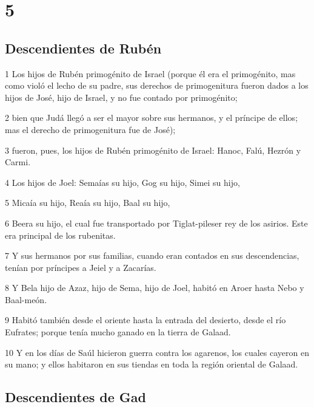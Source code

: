 \chapter{5}

\section*{Descendientes de Rubén}

\par 1 Los hijos de Rubén primogénito de Israel (porque él era el primogénito, mas como violó el lecho de su padre, sus derechos de primogenitura fueron dados a los hijos de José, hijo de Israel, y no fue contado por primogénito;
\par 2 bien que Judá llegó a ser el mayor sobre sus hermanos, y el príncipe de ellos; mas el derecho de primogenitura fue de José);
\par 3 fueron, pues, los hijos de Rubén primogénito de Israel: Hanoc, Falú, Hezrón y Carmi.
\par 4 Los hijos de Joel: Semaías su hijo, Gog su hijo, Simei su hijo,
\par 5 Micaía su hijo, Reaía su hijo, Baal su hijo,
\par 6 Beera su hijo, el cual fue transportado por Tiglat-pileser rey de los asirios. Este era principal de los rubenitas.
\par 7 Y sus hermanos por sus familias, cuando eran contados en sus descendencias, tenían por príncipes a Jeiel y a Zacarías.
\par 8 Y Bela hijo de Azaz, hijo de Sema, hijo de Joel, habitó en Aroer hasta Nebo y Baal-meón.
\par 9 Habitó también desde el oriente hasta la entrada del desierto, desde el río Eufrates; porque tenía mucho ganado en la tierra de Galaad.
\par 10 Y en los días de Saúl hicieron guerra contra los agarenos, los cuales cayeron en su mano; y ellos habitaron en sus tiendas en toda la región oriental de Galaad.

\section*{Descendientes de Gad}

